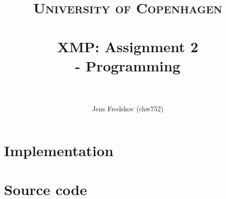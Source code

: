 \documentclass[a4paper, 11pt]{article}
\title{ 
\normalfont \normalsize 
\textsc{University of Copenhagen} \\ [25pt]
\horrule{0.5pt} \\[0.4cm]
\huge XMP: Assignment 2 \\ \Large - Programming \\
\horrule{2pt} \\[0.5cm]
}
\author{Jens Fredskov (chw752)}
\begin{document}
\maketitle
\pagebreak

\section{Implementation} %
\label{sec:implementation}


\appendix
\section{Source code} %
\label{sec:source_code}

\inputminted[fontsize=\scriptsize, frame=topline, label=main.go, linenos=true]{go}{../src/main.go}

\inputminted[fontsize=\scriptsize, frame=topline, label=xmpmud/structs.go, linenos=true]{go}{../src/xmpmud/structs.go}

\inputminted[fontsize=\scriptsize, frame=topline, label=xmpmud/controller.go, linenos=true]{go}{../src/xmpmud/controller.go}

\inputminted[fontsize=\scriptsize, frame=topline, label=xmpmud/player.go, linenos=true]{go}{../src/xmpmud/player.go}

\inputminted[fontsize=\scriptsize, frame=topline, label=xmpmud/room.go, linenos=true]{go}{../src/xmpmud/room.go}
\end{document}

